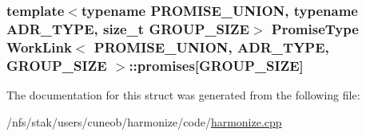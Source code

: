 \hypertarget{structWorkLink_a029f445c939f7a43774ccdab440ee5ee}{
\subsubsection[{promises}]{\setlength{\rightskip}{0pt plus 5cm}template$<$typename P\-R\-O\-M\-I\-S\-E\-\_\-\-U\-N\-I\-O\-N, typename A\-D\-R\-\_\-\-T\-Y\-P\-E, size\-\_\-t G\-R\-O\-U\-P\-\_\-\-S\-I\-Z\-E$>$ {\bf Promise\-Type} {\bf Work\-Link}$<$ P\-R\-O\-M\-I\-S\-E\-\_\-\-U\-N\-I\-O\-N, A\-D\-R\-\_\-\-T\-Y\-P\-E, G\-R\-O\-U\-P\-\_\-\-S\-I\-Z\-E $>$\-::promises\mbox{[}G\-R\-O\-U\-P\-\_\-\-S\-I\-Z\-E\mbox{]}}}\label{structWorkLink_a029f445c939f7a43774ccdab440ee5ee}


The documentation for this struct was generated from the following file\-:\begin{DoxyCompactItemize}
\item 
/nfs/stak/users/cuneob/harmonize/code/\hyperlink{harmonize_8cpp}{harmonize.\-cpp}\end{DoxyCompactItemize}
